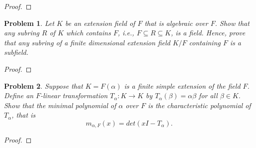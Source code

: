\documentclass[10pt]{article}
\newcommand{\sk}{\vskip 10mm}
\theoremstyle{plain}
\newtheorem{problem}{Problem}
\theoremstyle{remark}
\begin{document}
\begin{proof}
  
\end{proof}

\sk

\begin{problem}{6}
  Let $K$ be an extension field of $F$ that is algebraic over $F$.
  Show that any subring $R$ of $K$ which contains $F$, i.e.,
  $F \subseteq R \subseteq K$, is a field. Hence, prove that any subring of
  a finite dimensional extension field $K/F$ containing $F$ is a subfield.
\end{problem}

\begin{proof}
  
\end{proof}

\sk

\begin{problem}{7}
  Suppose that $K = F(\alpha)$ is a finite simple extension of the field $F$.
  Define an $F$-linear transformation
  $T_\alpha: K \to K$ by $T_\alpha (\beta) = \alpha\beta$ for all $\beta \in K$.
  Show that the minimal polynomial of $\alpha$ over $F$ is the characteristic
  polynomial of $T_\alpha$, that is
  \begin{equation*}
    m_{\alpha, F}(x) = det(xI - T_\alpha).
  \end{equation*}
\end{problem}

\begin{proof}
  
\end{proof}

\end{document}
